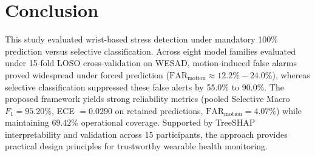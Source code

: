 \documentclass[conference]{IEEEtran}
\begin{document}
\section{Conclusion}
This study evaluated wrist-based stress detection under mandatory 100\% prediction versus selective classification. Across eight model families evaluated under 15-fold LOSO cross-validation on WESAD, motion-induced false alarms proved widespread under forced prediction ($\text{FAR}_{\text{motion}} \approx 12.2\% - 24.0\%$), whereas selective classification suppressed these false alerts by 55.0\% to 90.0\%. The proposed framework yields strong reliability metrics (pooled Selective Macro $F_1 = 95.20\%$, ECE $= 0.0290$ on retained predictions, $\text{FAR}_{\text{motion}} = 4.07\%$) while maintaining $69.42\%$ operational coverage. Supported by TreeSHAP interpretability and validation across 15 participants, the approach provides practical design principles for trustworthy wearable health monitoring.
\end{document}
